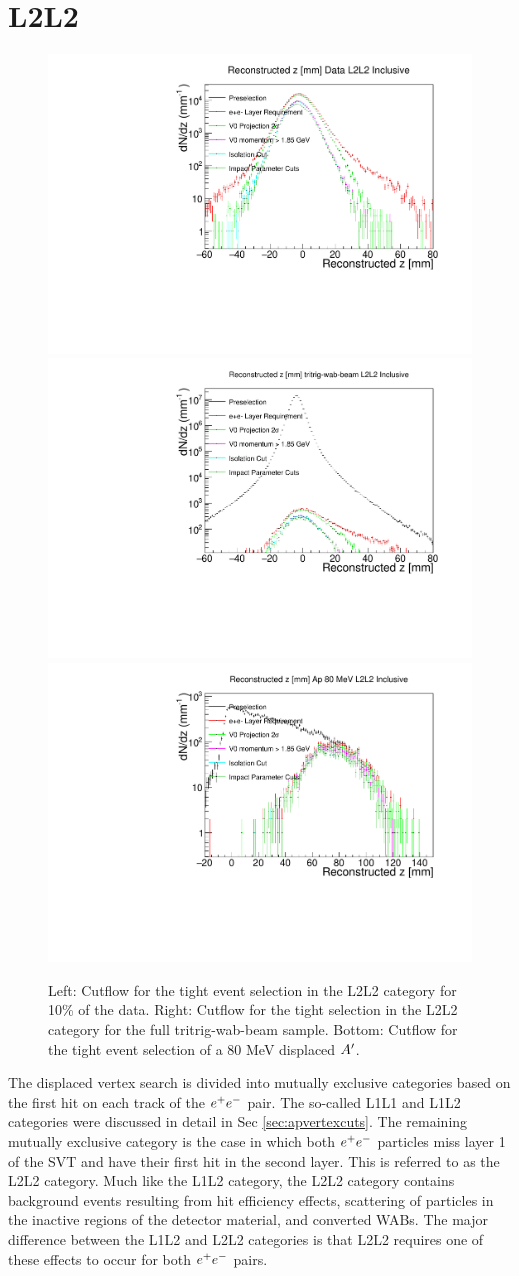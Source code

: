 \chapter{L2L2} \label{chap:L2L2}

\begin{figure}[!ht] 
    \centering
    \includegraphics[width=.45\textwidth]{figs/selection/10per_L2L2_cutflow.pdf}
    \includegraphics[width=.45\textwidth]{figs/selection/tritrig-wab-beam_L2L2_cutflow.pdf}
    \includegraphics[width=.45\textwidth]{figs/selection/ap_80MeV_L2L2_cutflow.pdf}
    \caption{
    	Left: Cutflow for the tight event selection in the L2L2 category for 10\% of the data. Right: Cutflow for the tight selection in the L2L2 category for the full tritrig-wab-beam sample. Bottom: Cutflow for the tight event selection of a 80 MeV displaced $A^\prime$. 
    }
    \label{fig:tightcutflow_L2L2}
\end{figure} 

The displaced vertex search is divided into mutually exclusive categories based on the first hit on each track of the $e^{+}e^{-}$ pair. The so-called L1L1 and L1L2 categories were discussed in detail in Sec \ref{sec:apvertexcuts}. The remaining mutually exclusive category is the case in which both $e^{+}e^{-}$ particles miss layer 1 of the SVT and have their first hit in the second layer. This is referred to as the L2L2 category. Much like the L1L2 category, the L2L2 category contains background events resulting from hit efficiency effects, scattering of particles in the inactive regions of the detector material, and converted WABs. The major difference between the L1L2 and L2L2 categories is that L2L2 requires one of these effects to occur for both $e^{+}e^{-}$ pairs. 

